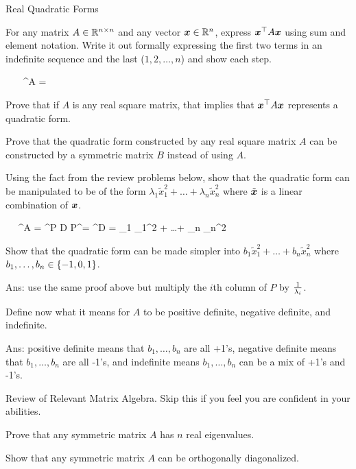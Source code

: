 \documentclass[12pt]{article}
\begin{document}
\eenum

\problem Real Quadratic Forms

\benum
\easysubproblem For any matrix $A \in \mathbb{R}^{n \times n}$ and any vector $\boldsymbol{x} \in \mathbb{R}^n$, express $\boldsymbol{x}^\top A \boldsymbol{x}$ using sum and element notation. Write it out formally expressing the first two terms in an indefinite sequence and the last (\ie $1,2, \ldots, n$) and show each step.

\beqn
{} ~~~  \x^\top A \x = 
\eeqn

\intermediatesubproblem Prove that if $A$ is any real square matrix, that implies that $\boldsymbol{x}^\top A \boldsymbol{x}$ represents a quadratic form.

\intermediatesubproblem Prove that the quadratic form constructed by any real square matrix $A$ can be constructed by a symmetric matrix $B$ instead of using $A$.

\easysubproblem Using the fact from the review problems below, show that the quadratic form can be manipulated to be of the form $\lambda_1 \tilde{x}_1^2 + \ldots + \lambda_n \tilde{x}_n^2$ where $\tilde{\boldsymbol{x}}$ is a linear combination of $\boldsymbol{x}$.


\beqn
{} ~~ \x^\top A \x = \x^\top P D P^\top \x = \tilde{\x}^\top D \tilde{\x} = \lambda_1 _1^2 + \ldots + \lambda_n _n^2
\eeqn

\easysubproblem Show that the quadratic form can be made simpler into $b_1 \tilde{x}_1^2 + \ldots + b_n \tilde{x}_n^2$ where $b_1, \ldots, b_n \in \left\{-1,0,1\right\}$.

Ans: use the same proof above but multiply the $i$th column of $P$ by $\frac{1}{\lambda_i}$.

\easysubproblem Define now what it means for $A$ to be positive definite, negative definite, and indefinite.

Ans: positive definite means that $b_1, \ldots, b_n$ are all +1's, negative definite means that $b_1, \ldots, b_n$ are all -1's, and indefinite means $b_1, \ldots, b_n$ can be a mix of +1's and -1's. 

\eenum

\problem Review of Relevant Matrix Algebra. Skip this if you feel you are confident in your abilities.

\benum
\easysubproblem Prove that any symmetric matrix $A$ has $n$ real eigenvalues.

\easysubproblem Show that any symmetric matrix $A$ can be orthogonally diagonalized.
\eenum
\end{document}
